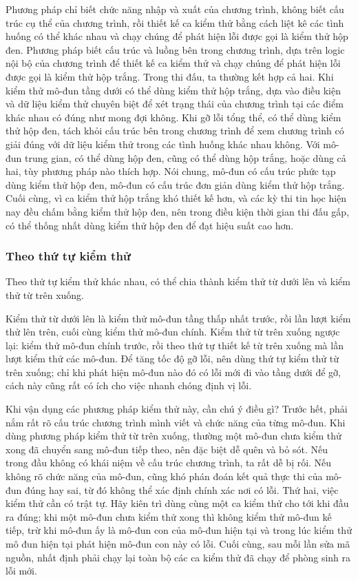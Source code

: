 \documentclass[11pt]{article}
\begin{document}
Phương pháp chỉ biết chức năng nhập và xuất của chương trình, không biết cấu
trúc cụ thể của chương trình, rồi thiết kế ca kiểm thử bằng cách liệt kê các
tình huống có thể khác nhau và chạy chúng để phát hiện lỗi được gọi là kiểm
thử hộp đen. Phương pháp biết cấu trúc và luồng bên trong chương trình, dựa
trên logic nội bộ của chương trình để thiết kế ca kiểm thử và chạy chúng để
phát hiện lỗi được gọi là kiểm thử hộp trắng. Trong thi đấu, ta thường kết
hợp cả hai. Khi kiểm thử mô-đun tầng dưới có thể dùng kiểm thử hộp trắng, dựa
vào điều kiện và dữ liệu kiểm thử chuyên biệt để xét trạng thái của chương
trình tại các điểm khác nhau có đúng như mong đợi không. Khi gỡ lỗi tổng thể,
có thể dùng kiểm thử hộp đen, tách khỏi cấu trúc bên trong chương trình để
xem chương trình có giải đúng với dữ liệu kiểm thử trong các tình huống khác
nhau không. Với mô-đun trung gian, có thể dùng hộp đen, cũng có thể dùng hộp
trắng, hoặc dùng cả hai, tùy phương pháp nào thích hợp. Nói chung, mô-đun có
cấu trúc phức tạp dùng kiểm thử hộp đen, mô-đun có cấu trúc đơn giản dùng
kiểm thử hộp trắng. Cuối cùng, vì ca kiểm thử hộp trắng khó thiết kế hơn, và
các kỳ thi tin học hiện nay đều chấm bằng kiểm thử hộp đen, nên trong điều
kiện thời gian thi đấu gấp, có thể thống nhất dùng kiểm thử hộp đen để đạt
hiệu suất cao hơn.

\subsubsection{Theo thứ tự kiểm thử}

Theo thứ tự kiểm thử khác nhau, có thể chia thành kiểm thử từ dưới lên và
kiểm thử từ trên xuống.

Kiểm thử từ dưới lên là kiểm thử mô-đun tầng thấp nhất trước, rồi lần lượt
kiểm thử lên trên, cuối cùng kiểm thử mô-đun chính. Kiểm thử từ trên xuống
ngược lại: kiểm thử mô-đun chính trước, rồi theo thứ tự thiết kế từ trên
xuống mà lần lượt kiểm thử các mô-đun. Để tăng tốc độ gỡ lỗi, nên dùng thứ
tự kiểm thử từ trên xuống; chỉ khi phát hiện mô-đun nào đó có lỗi mới đi vào
tầng dưới để gỡ, cách này cũng rất có ích cho việc nhanh chóng định vị lỗi.

Khi vận dụng các phương pháp kiểm thử này, cần chú ý điều gì? Trước hết, phải
nắm rất rõ cấu trúc chương trình mình viết và chức năng của từng mô-đun. Khi
dùng phương pháp kiểm thử từ trên xuống, thường một mô-đun chưa kiểm thử xong
đã chuyển sang mô-đun tiếp theo, nên đặc biệt dễ quên và bỏ sót. Nếu trong
đầu không có khái niệm về cấu trúc chương trình, ta rất dễ bị rối. Nếu không
rõ chức năng của mô-đun, cũng khó phán đoán kết quả thực thi của mô-đun đúng
hay sai, từ đó không thể xác định chính xác nơi có lỗi. Thứ hai, việc kiểm
thử cần có trật tự. Hãy kiên trì dùng cùng một ca kiểm thử cho tới khi đầu ra
đúng; khi một mô-đun chưa kiểm thử xong thì không kiểm thử mô-đun kế tiếp,
trừ khi mô-đun ấy là mô-đun con của mô-đun hiện tại và trong lúc kiểm thử mô
đun hiện tại phát hiện mô-đun con này có lỗi. Cuối cùng, sau mỗi lần sửa mã
nguồn, nhất định phải chạy lại toàn bộ các ca kiểm thử đã chạy để phòng sinh
ra lỗi mới.
\end{document}
